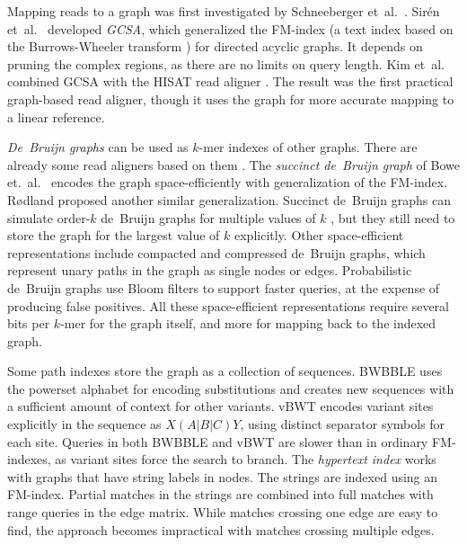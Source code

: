 \documentclass[a4paper,11pt]{llncs}
\newcommand{\kmer}[1]{$#1$\nobreakdash-mer}
\newcommand{\orderk}[1]{order\nobreakdash-$#1$}
\begin{document}
Mapping reads to a graph was first investigated by Schneeberger et~al.~\cite{Schneeberger2009}. Sirén et~al.~\cite{Siren2014} developed \emph{GCSA}, which generalized the FM\nobreakdash-index \cite{Ferragina2005a} (a text index based on the Burrows-Wheeler transform \cite{Burrows1994}) for directed acyclic graphs. It depends on pruning the complex regions, as there are no limits on query length. Kim et~al.~\cite{Kim2015-2016} combined GCSA with the HISAT read aligner \cite{Kim2015}. The result was the first practical graph-based read aligner, though it uses the graph for more accurate mapping to a linear reference.

\emph{De~Bruijn graphs} can be used as \kmer{k} indexes of other graphs. There are already some read aligners based on them \cite{Limasset2015,Liu2016}. The \emph{succinct de~Bruijn graph} of Bowe et.~al.~\cite{Bowe2012} encodes the graph space-efficiently with generalization of the FM\nobreakdash-index. Rødland \cite{Roedland2013} proposed another similar generalization. Succinct de~Bruijn graphs can simulate \orderk{k} de~Bruijn graphs for multiple values of $k$ \cite{Boucher2014}, but they still need to store the graph for the largest value of $k$ explicitly. Other space-efficient representations include compacted \cite{Cazaux2014} and compressed \cite{Marcus2014} de~Bruijn graphs, which represent unary paths in the graph as single nodes or edges. Probabilistic de~Bruijn graphs \cite{Pell2012} use Bloom filters to support faster queries, at the expense of producing false positives. All these space-efficient representations require several bits per \kmer{k} for the graph itself, and more for mapping back to the indexed graph.

Some path indexes store the graph as a collection of sequences. BWBBLE \cite{Huang2013} uses the powerset alphabet for encoding substitutions and creates new sequences with a sufficient amount of context for other variants. vBWT \cite{Maciuca2016} encodes variant sites explicitly in the sequence as $X(A|B|C)Y$, using distinct separator symbols for each site. Queries in both BWBBLE and vBWT are slower than in ordinary FM\nobreakdash-indexes, as variant sites force the search to branch. The \emph{hypertext index} \cite{Thachuk2013} works with graphs that have string labels in nodes. The strings are indexed using an FM-index. Partial matches in the strings are combined into full matches with range queries in the edge matrix. While matches crossing one edge are easy to find, the approach becomes impractical with matches crossing multiple edges.
\end{document}
